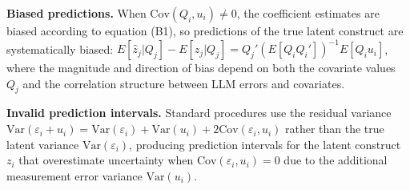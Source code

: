 \documentclass[11pt]{article}
\begin{document}
\textbf{Biased predictions.} When $\text{Cov}(Q_i, u_i) \neq 0$, the coefficient estimates are biased according to equation (B1), 
so predictions of the true latent construct are systematically biased: $E[\hat{z}_j | Q_j] - E[z_j | Q_j] = Q_j'(E[Q_i Q_i'])^{-1} E[Q_i u_i]$, 
where the magnitude and direction of bias depend on both the covariate values $Q_j$ and the correlation structure between LLM errors and covariates.

\textbf{Invalid prediction intervals.} Standard procedures use the residual variance 
$\text{Var}(\varepsilon_i + u_i) = \text{Var}(\varepsilon_i) + \text{Var}(u_i) + 2\text{Cov}(\varepsilon_i, u_i)$ 
rather than the true latent variance $\text{Var}(\varepsilon_i)$, producing prediction intervals 
for the latent construct $z_i$ that overestimate uncertainty when $\text{Cov}(\varepsilon_i, u_i) = 0$ due 
to the additional measurement error variance $\text{Var}(u_i)$.
\end{document}
